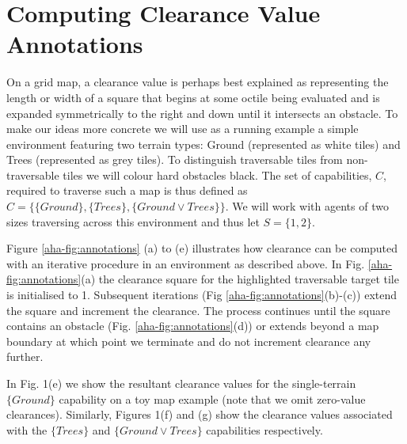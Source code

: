 \section{Computing Clearance Value Annotations}
\label{aha:planningwithannotations}
On a grid map, a clearance value is perhaps best explained as representing the length or width of a square that begins at some octile being evaluated and is expanded symmetrically to the right and down until it intersects an obstacle.     
To make our ideas more concrete we will use as a running example a simple environment featuring two terrain types: Ground (represented as white tiles) and Trees (represented as grey tiles). 
To distinguish traversable tiles from non-traversable tiles we will colour hard obstacles black. 
The set of capabilities, $C$, required to traverse such a map is thus defined as $C = \lbrace \lbrace Ground \rbrace, \lbrace Trees \rbrace, \lbrace Ground \vee Trees \rbrace \rbrace$. 
We will work with agents of two sizes traversing across this environment and thus let $S = \lbrace 1, 2 \rbrace$.
\par \indent
Figure \ref{aha-fig:annotations} (a) to (e) illustrates how clearance can be computed with an iterative procedure in an environment as described above.
In Fig. \ref{aha-fig:annotations}(a) the clearance square for the highlighted traversable target tile is initialised to 1. 
Subsequent iterations (Fig \ref{aha-fig:annotations}(b)-(c)) extend the square and increment the clearance. 
The process continues until the square contains an obstacle (Fig. \ref{aha-fig:annotations}(d)) or extends beyond a map boundary at which point we terminate and do not increment clearance any further.
\par \indent
In Fig. 1(e) we show the resultant clearance values for the single-terrain $\lbrace Ground \rbrace$ capability on a toy map example (note that we omit zero-value clearances).
Similarly, Figures 1(f) and (g) show the clearance values associated with the $\lbrace Trees \rbrace$ and $\lbrace Ground \vee Trees \rbrace$ capabilities respectively.  

